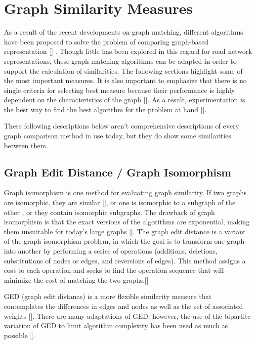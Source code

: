 \section{Graph Similarity Measures}
As a result of the recent developments on graph matching, different algorithms have been proposed to solve the problem of comparing graph-based representation [\cite{Bunke:2000}] . Though little has been explored in this regard for road network representations, these graph matching algorithms can be adapted in order to support the calculation of similarities. The following sections highlight some of the most important measures. It is also important to emphasize that there is no single criteria for selecting best measure because their performance is highly dependent on the characteristics of the graph [\cite{Papadimitriou:2010}]. As a result, experimentation is the best way to find the best algorithm for the problem at hand [\cite{Jouili:2010}]. 

These following descriptions below aren't comprehensive descriptions of every graph comparison method in use today, but they do show some similarities between them.

\subsection{Graph Edit Distance / Graph Isomorphism}
Graph isomorphism is one method for evaluating graph similarity. If two graphs are isomorphic, they are similar [\cite{Pelillo:1999}], or one is isomorphic to a subgraph of the other , or they contain isomorphic subgraphs. The drawback of graph isomorphism is that the exact versions of the algorithms are exponential, making them unsuitable for today's large graphs [\cite{Koutra:2011}]. The graph edit distance is a variant of the graph isomorphism problem, in which the goal is to transform one graph into another by performing a series of operations (additions, deletions, substitutions of nodes or edges, and reversions of edges). This method assigns a cost to each operation and seeks to find the operation sequence that will minimize the cost of matching the two graphs.[\cite{Koutra:2011}]

GED (graph edit distance) is a more flexible similarity measure that contemplates the differences in edges and nodes as well as the set of associated weights [\cite{Gao:2010}]. There are many adaptations of GED; however, the use of the bipartite variation of GED to limit algorithm complexity has been used as much as possible [\cite{Manrique:2018}]. 

